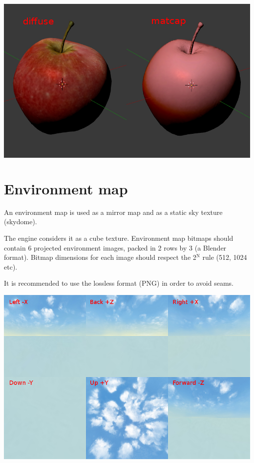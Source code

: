 \documentclass[a4paper,12pt,oneside]{sphinxmanual}
\begin{document}
\begin{DUlineblock}{0em}
\item[] 
\end{DUlineblock}

{\hfill\includegraphics[width=1.000\linewidth]{stencil_apple_separate_textures.jpg}\hfill}

\begin{DUlineblock}{0em}
\item[] 
\end{DUlineblock}


\section{Environment map}
\label{textures:environment-map}\label{textures:index-10}
An environment map is used as a mirror map and as a static sky texture (skydome).

The engine considers it as a cube texture. Environment map bitmaps should contain 6 projected environment images, packed in 2 rows by 3 (a Blender format). Bitmap dimensions for each image should respect the 2$^{\text{N}}$ rule (512, 1024 etc).

It is recommended to use the lossless format (PNG) in order to avoid seams.

{\hfill\includegraphics[width=1.000\linewidth]{environment_map.png}\hfill}
\end{document}
